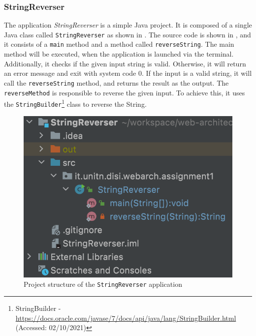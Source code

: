 \subsubsection{StringReverser}\label{subsubsec:01_part1_impl_stringreverser}
The application \textit{StringReverser} is a simple Java project. It is composed of a single Java class called \texttt{StringReverser} as shown in .
The source code is shown in , and it consists of a \texttt{main} method and a method called \texttt{reverseString}.
The main method will be executed, when the application is launched via the terminal. Additionally, it checks if the given input string is valid. Otherwise, it will return an error message and exit with system code 0. If the input is a valid string, it will call the \texttt{reverseString} method, and returns the result as the output.
The \texttt{reverseMethod} is responsible to reverse the given input. To achieve this, it uses the \texttt{StringBuilder}\footnote{StringBuilder - \url{https://docs.oracle.com/javase/7/docs/api/java/lang/StringBuilder.html} (Accessed: 02/10/2021)} class to reverse the String.

\begin{figure}[h]
\centering
\includegraphics[scale=0.4]{images/StringReverserStrct}
\caption{Project structure of the \texttt{StringReverser} application}
\label{fig:01_part1_impl_stringreverser_structure}
\end{figure}

